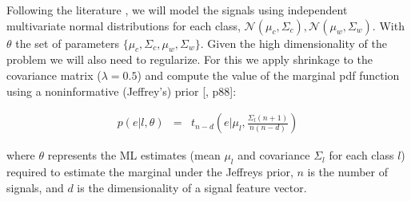 Following the literature \cite{blankertz2010single}, we will model the signals using independent multivariate normal distributions for each class, $\mathcal{N}(\mu_c, \Sigma_c), \mathcal{N}(\mu_w, \Sigma_w)$. With $\theta$ the set of parameters $\{\mu_c, \Sigma_c,\mu_w, \Sigma_w\}$. Given the high dimensionality of the problem we will also need to regularize. For this we apply shrinkage to the covariance matrix ($\lambda = 0.5$) and compute the value of the marginal pdf function using a noninformative (Jeffrey's) prior [\cite{gelman2003bayesian}, p88]:

\begin{eqnarray}
p(e|l, \theta) & = & t_{n-d}(e | \mu_l,\frac{\Sigma_l (n+1)}{n(n-d)})
\label{eq:prior}
\end{eqnarray}

where $\theta$ represents the ML estimates (mean $\mu_l$ and covariance $\Sigma_l$ for each class $l$) required to estimate the marginal under the Jeffreys prior, $n$ is the number of signals, and $d$ is the dimensionality of a signal feature vector.

